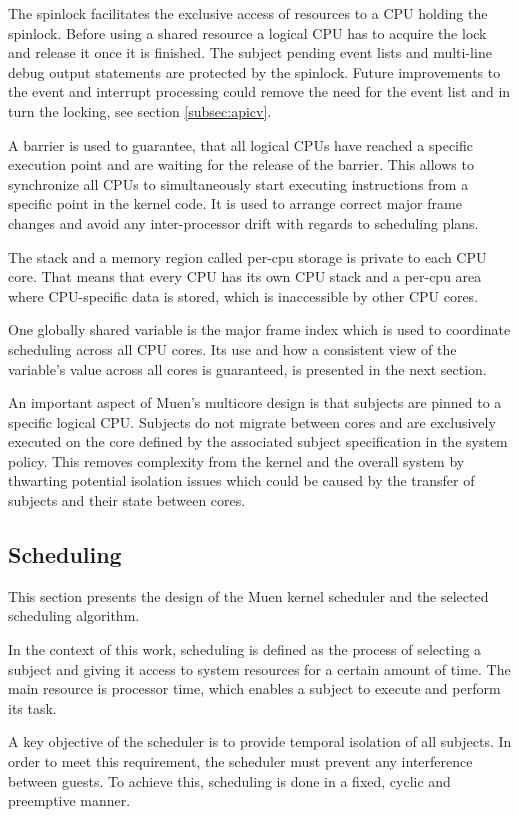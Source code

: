 The spinlock facilitates the exclusive access of resources to a CPU holding the
spinlock. Before using a shared resource a logical CPU has to acquire the lock
and release it once it is finished. The subject pending event lists and
multi-line debug output statements are protected by the spinlock. Future
improvements to the event and interrupt processing could remove the need for the
event list and in turn the locking, see section \ref{subsec:apicv}.

A barrier is used to guarantee, that all logical CPUs have reached a specific
execution point and are waiting for the release of the barrier. This allows to
synchronize all CPUs to simultaneously start executing instructions from a
specific point in the kernel code. It is used to arrange correct major frame
changes and avoid any inter-processor drift with regards to scheduling plans.

The stack and a memory region called per-cpu storage is private to each CPU
core. That means that every CPU has its own CPU stack and a per-cpu area where
CPU-specific data is stored, which is inaccessible by other CPU cores.

One globally shared variable is the major frame index which is used to
coordinate scheduling across all CPU cores. Its use and how a consistent view of
the variable's value across all cores is guaranteed, is presented in the next
section.

An important aspect of Muen's multicore design is that subjects are pinned to a
specific logical CPU. Subjects do not migrate between cores and are exclusively
executed on the core defined by the associated subject specification in the
system policy. This removes complexity from the kernel and the overall system by
thwarting potential isolation issues which could be caused by the transfer of
subjects and their state between cores.

\subsection{Scheduling}\label{subsec:design-scheduling}
This section presents the design of the Muen kernel scheduler and the selected
scheduling algorithm.

In the context of this work, scheduling is defined as the process of selecting
a subject and giving it access to system resources for a certain amount of time.
The main resource is processor time, which enables a subject to execute and
perform its task.

A key objective of the scheduler is to provide temporal isolation of all
subjects. In order to meet this requirement, the scheduler must prevent any
interference between guests. To achieve this, scheduling is done in a fixed,
cyclic and preemptive manner.

